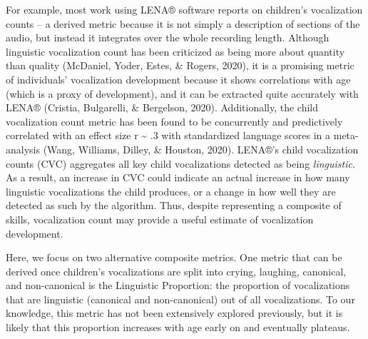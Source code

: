 \documentclass[
  english,
  ,man]{apa6}
\begin{document}
For example, most work using LENA® software reports on children's vocalization counts -- a derived metric because it is not simply a description of sections of the audio, but instead it integrates over the whole recording length. Although linguistic vocalization count has been criticized as being more about quantity than quality (McDaniel, Yoder, Estes, \& Rogers, 2020), it is a promising metric of individuals' vocalization development because it shows correlations with age (which is a proxy of development), and it can be extracted quite accurately with LENA® (Cristia, Bulgarelli, \& Bergelson, 2020). Additionally, the child vocalization count metric has been found to be concurrently and predictively correlated with an effect size r \textasciitilde{} .3 with standardized language scores in a meta-analysis (Wang, Williams, Dilley, \& Houston, 2020). LENA®'s child vocalization counts (CVC) aggregates all key child vocalizations detected as being \emph{linguistic}. As a result, an increase in CVC could indicate an actual increase in how many linguistic vocalizations the child produces, or a change in how well they are detected as such by the algorithm. Thus, despite representing a composite of skills, vocalization count may provide a useful estimate of vocalization development.

Here, we focus on two alternative composite metrics. One metric that can be derived once children's vocalizations are split into crying, laughing, canonical, and non-canonical is the Linguistic Proportion: the proportion of vocalizations that are linguistic (canonical and non-canonical) out of all vocalizations. To our knowledge, this metric has not been extensively explored previously, but it is likely that this proportion increases with age early on and eventually plateaus.
\end{document}
